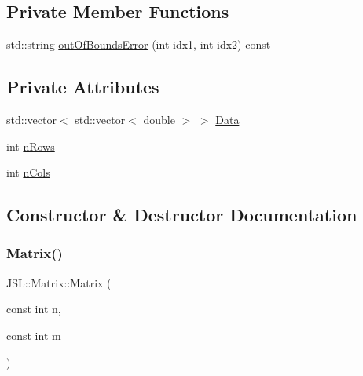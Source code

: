 \subsection*{Private Member Functions}
\begin{DoxyCompactItemize}
\item 
std\+::string \hyperlink{classJSL_1_1Matrix_a92eb431da436e1e2922b211a9f158203}{out\+Of\+Bounds\+Error} (int idx1, int idx2) const
\end{DoxyCompactItemize}
\subsection*{Private Attributes}
\begin{DoxyCompactItemize}
\item 
std\+::vector$<$ std\+::vector$<$ double $>$ $>$ \hyperlink{classJSL_1_1Matrix_a446d23ba93238f3e2dfc79a3a4d5eb7e}{Data}
\item 
int \hyperlink{classJSL_1_1Matrix_a7b7a081bbf419b613f19142a634b2cfa}{n\+Rows}
\item 
int \hyperlink{classJSL_1_1Matrix_aef59f1402d2137e86aebf6b21f97ee6d}{n\+Cols}
\end{DoxyCompactItemize}


\subsection{Constructor \& Destructor Documentation}
\mbox{\label{classJSL_1_1Matrix_a90ddd1113043b8959b0943be24f9ad9f}} 
\subsubsection{\texorpdfstring{Matrix()}{Matrix()}\hspace{0.1cm}{\footnotesize\ttfamily [1/3]}}
{\footnotesize\ttfamily J\+S\+L\+::\+Matrix\+::\+Matrix (\begin{DoxyParamCaption}\item[{const int}]{n,  }\item[{const int}]{m }\end{DoxyParamCaption})\hspace{0.3cm}{\ttfamily [inline]}}

\mbox{\label{classJSL_1_1Matrix_ab6bc06d3dcc5f25f2083d3a3946378df}} 
